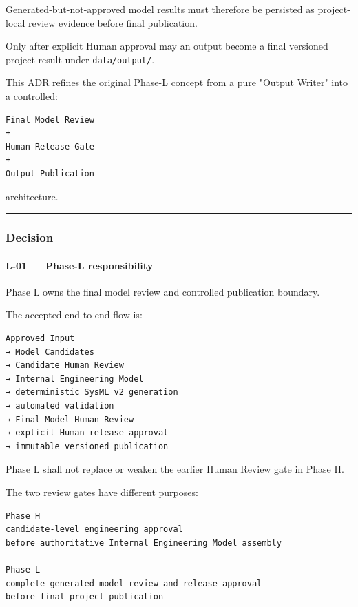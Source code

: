 Generated-but-not-approved model results must therefore be persisted as project-local review evidence before final publication.

Only after explicit Human approval may an output become a final versioned project result under \texttt{data/output/}.

This ADR refines the original Phase-L concept from a pure "Output Writer" into a controlled:

\begin{verbatim}
Final Model Review
+
Human Release Gate
+
Output Publication
\end{verbatim}

architecture.

\begin{center}\rule{0.5\linewidth}{0.5pt}\end{center}

\hypertarget{decision-8}{%
\subsubsection{Decision}\label{decision-8}}

\hypertarget{l-01--phase-l-responsibility}{%
\paragraph{L-01 --- Phase-L responsibility}\label{l-01--phase-l-responsibility}}

Phase L owns the final model review and controlled publication boundary.

The accepted end-to-end flow is:

\begin{verbatim}
Approved Input
→ Model Candidates
→ Candidate Human Review
→ Internal Engineering Model
→ deterministic SysML v2 generation
→ automated validation
→ Final Model Human Review
→ explicit Human release approval
→ immutable versioned publication
\end{verbatim}

Phase L shall not replace or weaken the earlier Human Review gate in Phase H.

The two review gates have different purposes:

\begin{verbatim}
Phase H
candidate-level engineering approval
before authoritative Internal Engineering Model assembly

Phase L
complete generated-model review and release approval
before final project publication
\end{verbatim}

